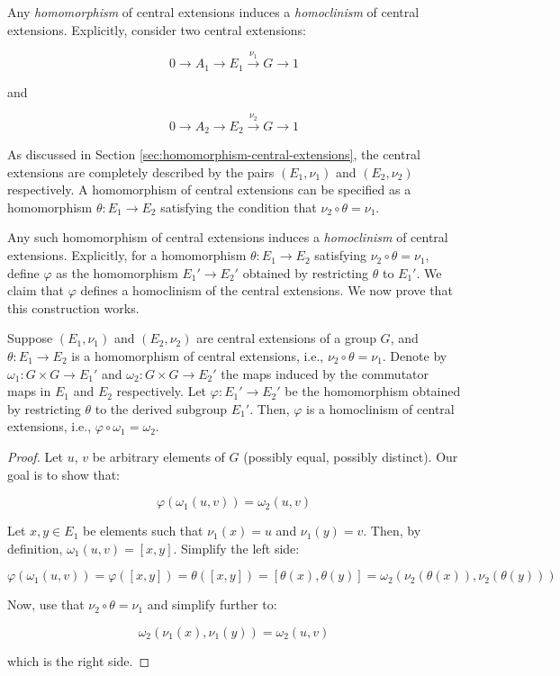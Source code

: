 \documentclass{ucetd}
\begin{document}
Any {\em homomorphism} of central extensions induces a {\em
  homoclinism} of central extensions. Explicitly, consider two central
extensions:

$$0 \to A_1 \to E_1 \stackrel{\nu_1}{\to} G \to 1$$

and

$$0 \to A_2 \to E_2 \stackrel{\nu_2}{\to} G \to 1$$

As discussed in Section \ref{sec:homomorphism-central-extensions}, the
central extensions are completely described by the pairs $(E_1,\nu_1)$
and $(E_2,\nu_2)$ respectively. A homomorphism of central extensions
can be specified as a homomorphism $\theta:E_1 \to E_2$ satisfying the
condition that $\nu_2 \circ \theta = \nu_1$.

Any such homomorphism of central extensions induces a {\em
  homoclinism} of central extensions. Explicitly, for a homomorphism
$\theta: E_1 \to E_2$ satisfying $\nu_2 \circ \theta = \nu_1$, define
$\varphi$ as the homomorphism $E_1' \to E_2'$ obtained by restricting
$\theta$ to $E_1'$. We claim that $\varphi$ defines a homoclinism of
the central extensions. We now prove that this construction works.

\begin{lemma}\label{lemma:homomorphism-restriction-homoclinism}
  Suppose $(E_1,\nu_1)$ and $(E_2,\nu_2)$ are central extensions of a
  group $G$, and $\theta:E_1 \to E_2$ is a homomorphism of central
  extensions, i.e., $\nu_2 \circ \theta = \nu_1$. Denote by $\omega_1:
  G \times G \to E_1'$ and $\omega_2: G \times G \to E_2'$ the maps
  induced by the commutator maps in $E_1$ and $E_2$ respectively. Let
  $\varphi:E_1' \to E_2'$ be the homomorphism obtained by restricting
  $\theta$ to the derived subgroup $E_1'$. Then, $\varphi$ is a
  homoclinism of central extensions, i.e., $\varphi \circ \omega_1 =
  \omega_2$.
\end{lemma}

\begin{proof}
  Let $u$, $v$ be arbitrary elements of $G$ (possibly equal, possibly
  distinct). Our goal is to show that:

  $$\varphi(\omega_1(u,v)) = \omega_2(u,v)$$

  Let $x, y \in E_1$ be elements such that $\nu_1(x) = u$ and
  $\nu_1(y) = v$. Then, by definition, $\omega_1(u,v) =
  [x,y]$. Simplify the left side:

  $$\varphi(\omega_1(u,v)) = \varphi([x,y]) = \theta([x,y]) = [\theta(x),\theta(y)] = \omega_2(\nu_2(\theta(x)),\nu_2(\theta(y)))$$

  Now, use that $\nu_2 \circ \theta = \nu_1$ and simplify further to:

  $$\omega_2(\nu_1(x),\nu_1(y)) = \omega_2(u,v)$$

  which is the right side.
\end{proof}
\end{document}
